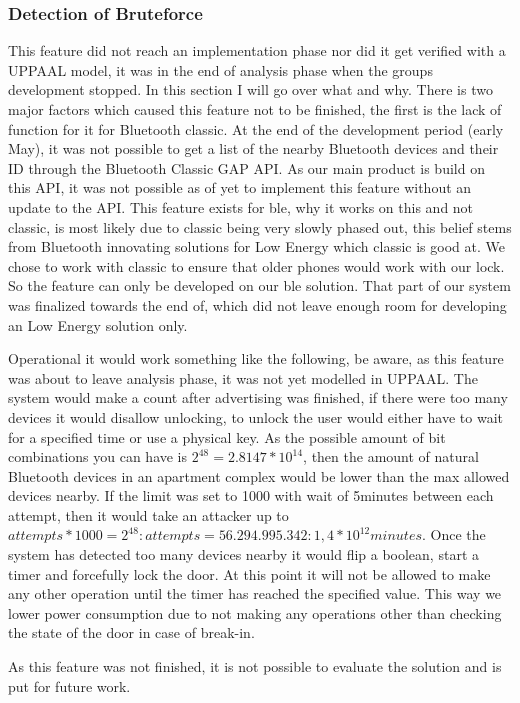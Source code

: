 \subsubsection{Detection of Bruteforce}
This feature did not reach an implementation phase nor did it get verified with a UPPAAL model, it was in the end of analysis phase when the groups development stopped. In this section I will go over what and why. There is two major factors which caused this feature not to be finished, the first is the lack of function for it for Bluetooth classic\cite{ESPClassicAPI}. At the end of the development period (early May), it was not possible to get a list of the nearby Bluetooth devices and their ID through the Bluetooth Classic GAP API. As our main product is build on this API, it was not possible as of yet to implement this feature without an update to the API. This feature exists for \gls{ble}\cite{ESPBLEGAP}, why it works on this and not classic, is most likely due to classic being very slowly phased out, this belief stems from Bluetooth innovating solutions for Low Energy which classic is good at\cite{BLEAudio}. We chose to work with classic to ensure that older phones would work with our lock. So the feature can only be developed on our \gls{ble} solution. That part of our system was finalized towards the end of, which did not leave enough room for developing an Low Energy solution only.

Operational it would work something like the following, be aware, as this feature was about to leave analysis phase, it was not yet modelled in UPPAAL. The system would make a count after advertising was finished, if there were too many devices it would disallow unlocking, to unlock the user would either have to wait for a specified time or use a physical key. As the possible amount of bit combinations you can have is $2^{48}=2.8147*10^{14}$, then the amount of natural Bluetooth devices in an apartment complex would be lower than the max allowed devices nearby. If the limit was set to 1000 with wait of 5minutes between each attempt, then it would take an attacker up to $attempts*1000=2^{48} : attempts=56.294.995.342 :  1,4*10^{12}minutes$. Once the system has detected too many devices nearby it would flip a boolean, start a timer and forcefully lock the door. At this point it will not be allowed to make any other operation until the timer has reached the specified value. This way we lower power consumption due to not making any operations other than checking the state of the door in case of break-in.

As this feature was not finished, it is not possible to evaluate the solution and is put for future work.